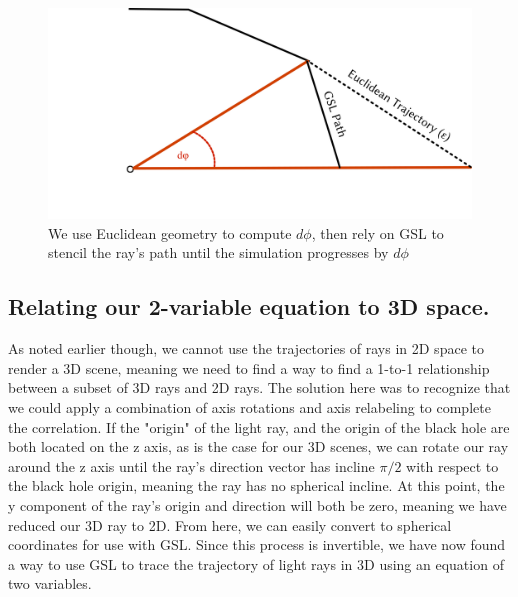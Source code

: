 \begin{figure}[h]
  \centering
  \includegraphics[width=.65\linewidth]{figs/nextpoint}
  \caption{We use Euclidean geometry to compute $d\phi$, then rely on GSL to stencil the ray's path until the simulation progresses by $d\phi$}
  \label{fig:nextpoint}
\end{figure}


\subsection{Relating our 2-variable equation to 3D space.}
As noted earlier though, we cannot use the trajectories of rays in 2D space to render a 3D scene, meaning we need to find a way to find a 1-to-1 relationship between a subset of 3D rays and 2D rays. The solution here was to recognize that we could apply a combination of axis rotations and axis relabeling to complete the correlation. If the "origin" of the light ray, and the origin of the black hole are both located on the z axis, as is the case for our 3D scenes, we can rotate our ray around the z axis until the ray's direction vector has incline $ \pi / 2 $ with respect to the black hole origin, meaning the ray has no spherical incline. At this point, the y component of the ray's origin and direction will both be zero, meaning we have reduced our 3D ray to 2D. From here, we can easily convert to spherical coordinates for use with GSL. Since this process is invertible, we have now found a way to use GSL to trace the trajectory of light rays in 3D using an equation of two variables.


